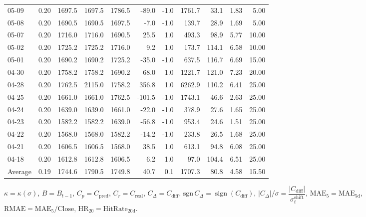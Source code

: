 \begin{threeparttable}
{\begin{tabular}{lrrrrrrrrrr}
05-09 & 0.20 & 1697.5 & 1697.5 & 1786.5 & -89.0 & -1.0 & 1761.7 & 33.1 & 1.83 & 5.00 \\
05-08 & 0.20 & 1690.5 & 1690.5 & 1697.5 & -7.0 & -1.0 & 139.7 & 28.9 & 1.69 & 5.00 \\
05-07 & 0.20 & 1716.0 & 1716.0 & 1690.5 & 25.5 & 1.0 & 493.3 & 98.9 & 5.77 & 10.00 \\
05-02 & 0.20 & 1725.2 & 1725.2 & 1716.0 & 9.2 & 1.0 & 173.7 & 114.1 & 6.58 & 10.00 \\
05-01 & 0.20 & 1690.2 & 1690.2 & 1725.2 & -35.0 & -1.0 & 637.5 & 116.7 & 6.69 & 15.00 \\
04-30 & 0.20 & 1758.2 & 1758.2 & 1690.2 & 68.0 & 1.0 & 1221.7 & 121.0 & 7.23 & 20.00 \\
04-28 & 0.20 & 1762.5 & 2115.0 & 1758.2 & 356.8 & 1.0 & 6262.9 & 110.2 & 6.41 & 25.00 \\
04-25 & 0.20 & 1661.0 & 1661.0 & 1762.5 & -101.5 & -1.0 & 1743.1 & 46.6 & 2.63 & 25.00 \\
04-24 & 0.20 & 1639.0 & 1639.0 & 1661.0 & -22.0 & -1.0 & 378.9 & 27.6 & 1.65 & 25.00 \\
04-23 & 0.20 & 1582.2 & 1582.2 & 1639.0 & -56.8 & -1.0 & 953.4 & 24.6 & 1.51 & 25.00 \\
04-22 & 0.20 & 1568.0 & 1568.0 & 1582.2 & -14.2 & -1.0 & 233.8 & 26.5 & 1.68 & 25.00 \\
04-21 & 0.20 & 1606.5 & 1606.5 & 1568.0 & 38.5 & 1.0 & 613.1 & 94.8 & 6.08 & 25.00 \\
04-18 & 0.20 & 1612.8 & 1612.8 & 1606.5 & 6.2 & 1.0 & 97.0 & 104.4 & 6.51 & 25.00 \\
Average & 0.19 & 1744.6 & 1790.5 & 1749.8 & 40.7 & 0.1 & 1707.3 & 80.8 & 4.58 & 15.50 \\
\bottomrule
\end{tabular}
}%
\begin{tablenotes}\footnotesize
\item $\kappa=\kappa(\sigma)$, $B=B_{t-1}$, $C_p=C_{\text{pred}}$, $C_r=C_{\text{real}}$, $C_\Delta=C_{\text{diff}}$, $\mathrm{sgn}\,C_\Delta=\operatorname{sign}(C_{\text{diff}})$, $|C_\Delta|/\sigma=\dfrac{|C_{\text{diff}}|}{\sigma_t^{\text{shift}}}$, $\mathrm{MAE}_5=\mathrm{MAE}_{5\text{d}}$, $\mathrm{RMAE}= \mathrm{MAE}_5 / \text{Close}$, $\mathrm{HR}_{20}=\mathrm{HitRate}_{20\text{d}}$.
\end{tablenotes}
\end{threeparttable}
\endgroup